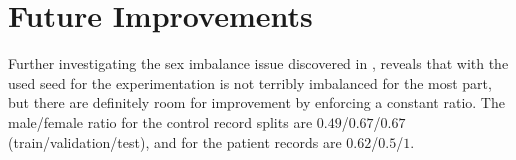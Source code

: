 \label{sec:conclusions}







\section{Future Improvements}
\label{sec:improve}

Further investigating the sex imbalance issue discovered in , reveals that with the used seed for the experimentation is not terribly imbalanced for the most part, but there are definitely room for improvement by enforcing a constant ratio. The male/female ratio for the control record splits are $0.49$/$0.67$/$0.67$ (train/validation/test), and for the patient records are $0.62$/$0.5$/$1$.





